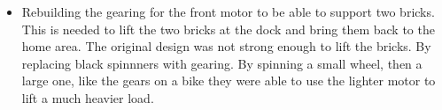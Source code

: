 
\begin{itemize}
  \item Rebuilding the gearing for the front motor to be able to support two bricks.  This is needed to lift the two bricks at the dock and bring them back to the home area.  The original design was not strong enough to lift the bricks.  By replacing black spinnners with gearing.  By spinning a small wheel, then a large one, like the gears on a bike they were able to use the lighter motor to lift a much heavier load.

\end{itemize}
